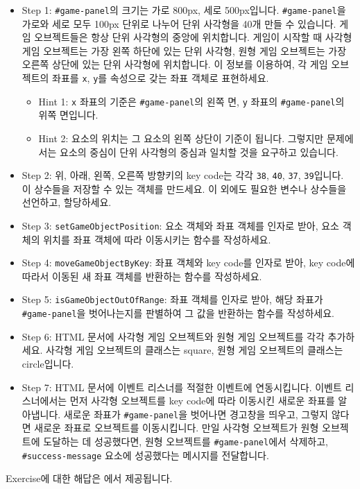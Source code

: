 \begin{itemize}
    \item Step 1: \texttt{\#game-panel}의 크기는 가로 800px, 세로 500px입니다. \texttt{\#game-panel}을 가로와 세로 모두 100px 단위로 나누어 단위 사각형을 40개 만들 수 있습니다. 게임 오브젝트들은 항상 단위 사각형의 중앙에 위치합니다. 게임이 시작할 때 사각형 게임 오브젝트는 가장 왼쪽 하단에 있는 단위 사각형, 원형 게임 오브젝트는 가장 오른쪽 상단에 있는 단위 사각형에 위치합니다. 이 정보를 이용하여, 각 게임 오브젝트의 좌표를 \texttt{x}, \texttt{y}를 속성으로 갖는 좌표 객체로 표현하세요.
    \begin{itemize}
        \item Hint 1: \texttt{x} 좌표의 기준은 \texttt{\#game-panel}의 왼쪽 면, \texttt{y} 좌표의 \texttt{\#game-panel}의 위쪽 면입니다.
        \item Hint 2: 요소의 위치는 그 요소의 왼쪽 상단이 기준이 됩니다. 그렇지만 문제에서는 요소의 중심이 단위 사각형의 중심과 일치할 것을 요구하고 있습니다.
    \end{itemize}
    \item Step 2: 위, 아래, 왼쪽, 오른쪽 방향키의 key code는 각각 \texttt{38}, \texttt{40}, \texttt{37}, \texttt{39}입니다. 이 상수들을 저장할 수 있는 객체를 만드세요. 이 외에도 필요한 변수나 상수들을 선언하고, 할당하세요.
    \item Step 3: \texttt{setGameObjectPosition}: 요소 객체와 좌표 객체를 인자로 받아, 요소 객체의 위치를 좌표 객체에 따라 이동시키는 함수를 작성하세요.
    \item Step 4: \texttt{moveGameObjectByKey}: 좌표 객체와 key code를 인자로 받아, key code에 따라서 이동된 새 좌표 객체를 반환하는 함수를 작성하세요.
    \item Step 5: \texttt{isGameObjectOutOfRange}: 좌표 객체를 인자로 받아, 해당 좌표가 \texttt{\#game-panel}을 벗어나는지를 판별하여 그 값을 반환하는 함수를 작성하세요.
    \item Step 6: HTML 문서에 사각형 게임 오브젝트와 원형 게임 오브젝트를 각각 추가하세요. 사각형 게임 오브젝트의 클래스는 square, 원형 게임 오브젝트의 클래스는 circle입니다.
    \item Step 7: HTML 문서에 이벤트 리스너를 적절한 이벤트에 연동시킵니다. 이벤트 리스너에서는 먼저 사각형 오브젝트를 key code에 따라 이동시킨 새로운 좌표를 알아냅니다. 새로운 좌표가 \texttt{\#game-panel}을 벗어나면 경고창을 띄우고, 그렇지 않다면 새로운 좌표로 오브젝트를 이동시킵니다. 만일 사각형 오브젝트가 원형 오브젝트에 도달하는 데 성공했다면, 원형 오브젝트를 \texttt{\#game-panel}에서 삭제하고, \texttt{\#success-message} 요소에 성공했다는 메시지를 전달합니다.
\end{itemize}

Exercise에 대한 해답은 에서 제공됩니다.
